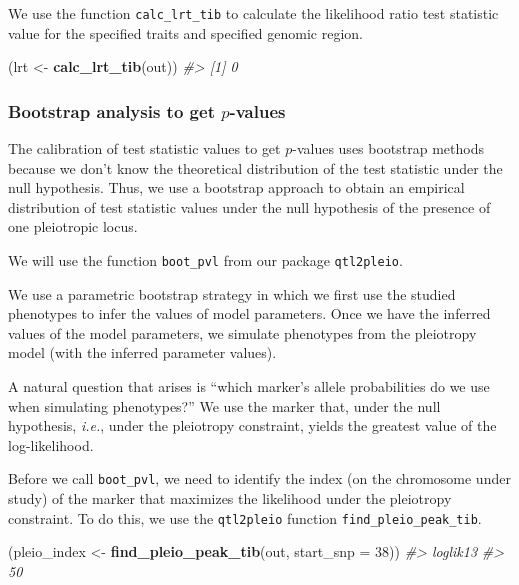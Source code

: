 \documentclass[oneside]{book}\usepackage[]{graphicx}\usepackage[]{color}
\newenvironment{Shaded}{\begin{snugshade}}{\end{snugshade}}
\newcommand{\CommentTok}[1]{\textcolor[rgb]{0.56,0.35,0.01}{\textit{#1}}}
\newcommand{\DataTypeTok}[1]{\textcolor[rgb]{0.13,0.29,0.53}{#1}}
\newcommand{\DecValTok}[1]{\textcolor[rgb]{0.00,0.00,0.81}{#1}}
\newcommand{\KeywordTok}[1]{\textcolor[rgb]{0.13,0.29,0.53}{\textbf{#1}}}
\newcommand{\NormalTok}[1]{#1}
\newcommand{\StringTok}[1]{\textcolor[rgb]{0.31,0.60,0.02}{#1}}
\begin{document}
We use the function \texttt{calc\_lrt\_tib} to calculate the likelihood
ratio test statistic value for the specified traits and specified
genomic region.

\begin{Shaded}
\begin{Highlighting}[]
\NormalTok{(lrt <-}\StringTok{ }\KeywordTok{calc_lrt_tib}\NormalTok{(out))}
\CommentTok{#> [1] 0}
\end{Highlighting}
\end{Shaded}

\hypertarget{bootstrap-analysis-to-get-p-values}{%
\subsubsection{Bootstrap analysis to get
$p$-values}\label{bootstrap-analysis-to-get-p-values}}

The calibration of test statistic values to get $p$-values uses bootstrap
methods because we don't know the theoretical distribution of the test
statistic under the null hypothesis. Thus, we use a bootstrap approach
to obtain an empirical distribution of test statistic values under the
null hypothesis of the presence of one pleiotropic locus.

We will use the function \texttt{boot\_pvl} from our package
\texttt{qtl2pleio}.

We use a parametric bootstrap strategy in which we first use the studied
phenotypes to infer the values of model parameters. Once we have the
inferred values of the model parameters, we simulate phenotypes from the
pleiotropy model (with the inferred parameter values).

A natural question that arises is ``which marker's allele probabilities
do we use when simulating phenotypes?'' We use the marker that, under
the null hypothesis, \emph{i.e.}, under the pleiotropy constraint,
yields the greatest value of the log-likelihood.

Before we call \texttt{boot\_pvl}, we need to identify the index (on the
chromosome under study) of the marker that maximizes the likelihood
under the pleiotropy constraint. To do this, we use the
\texttt{qtl2pleio} function \texttt{find\_pleio\_peak\_tib}.

\begin{Shaded}
\begin{Highlighting}[]
\NormalTok{(pleio_index <-}\StringTok{ }\KeywordTok{find_pleio_peak_tib}\NormalTok{(out, }\DataTypeTok{start_snp =} \DecValTok{38}\NormalTok{))}
\CommentTok{#> loglik13 }
\CommentTok{#>       50}
\end{Highlighting}
\end{Shaded}
\end{document}

